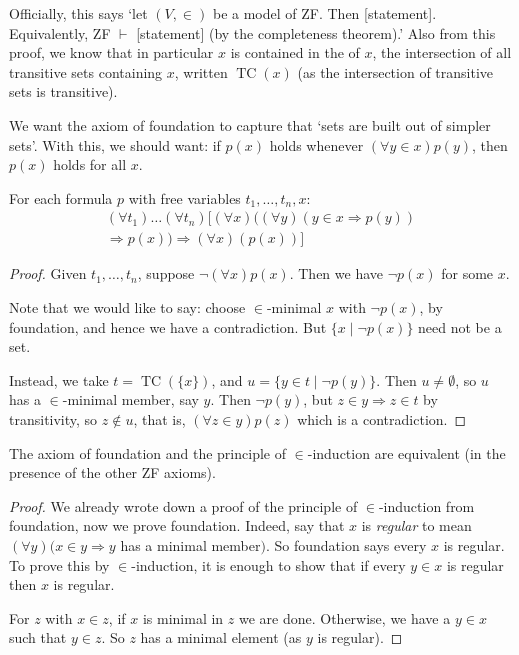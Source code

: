 \documentclass[a4paper, 10pt, twocolumn]{amsart}
\begin{document}
\begin{remark}
  Officially, this says `let $(V, \in)$ be a model of ZF. Then [statement]. Equivalently, ZF $\vdash$ [statement] (by the completeness theorem).' Also from this proof, we know that in particular $x$ is contained in the  of $x$, the intersection of all transitive sets containing $x$, written $\operatorname{TC}(x)$ (as the intersection of transitive sets is transitive).
\end{remark}

We want the axiom of foundation to capture that `sets are built out of simpler sets'. With this, we should want: if $p(x)$ holds whenever $(\forall y \in x) p(y)$, then $p(x)$ holds for all $x$.

\begin{theorem}
  For each formula $p$ with free variables $t_1, \dots, t_n, x$:
  \begin{align*}
  \left(\forall t_1\right) \ldots\left(\forall t_n\right)[(\forall x)((\forall y)(y \in x \Rightarrow p(y)) \\
  \Rightarrow p(x)) \Rightarrow(\forall x)(p(x))]
  \end{align*}
\end{theorem}
\begin{proof}
  Given $t_1, \dots, t_n$, suppose $\lnot (\forall x)p(x)$. Then we have $\lnot p(x)$ for some $x$.

  Note that we would like to say: choose $\in$-minimal $x$ with $\lnot p(x)$, by foundation, and hence we have a contradiction. But $\{x \mid \lnot p(x)\}$ need not be a set.

  Instead, we take $t = \operatorname{TC}(\{x\})$, and $u = \{y \in t\mid \lnot p(y)\}$. Then $u \neq \emptyset$, so $u$ has a $\in$-minimal member, say $y$. Then $\lnot p(y)$, but $z \in y \Rightarrow z \in t$ by transitivity, so $z \not \in u$, that is, $(\forall z \in y)p(z)$ which is a contradiction.
\end{proof}

\begin{theorem}
  The axiom of foundation and the principle of $\in$-induction are equivalent (in the presence of the other ZF axioms).
\end{theorem}
\begin{proof}
  We already wrote down a proof of the principle of $\in$-induction from foundation, now we prove foundation. Indeed, say that $x$ is \emph{regular} to mean $(\forall y)(x \in y \Rightarrow y$ has a minimal member$)$. So foundation says every $x$ is regular. To prove this by $\in$-induction, it is enough to show that if every $y \in x$ is regular then $x$ is regular. 

  For $z$ with $x \in z$, if $x$ is minimal in $z$ we are done. Otherwise, we have a $y\in x$ such that $y \in z$. So $z$ has a minimal element (as $y$ is regular).
\end{proof}
\end{document}

